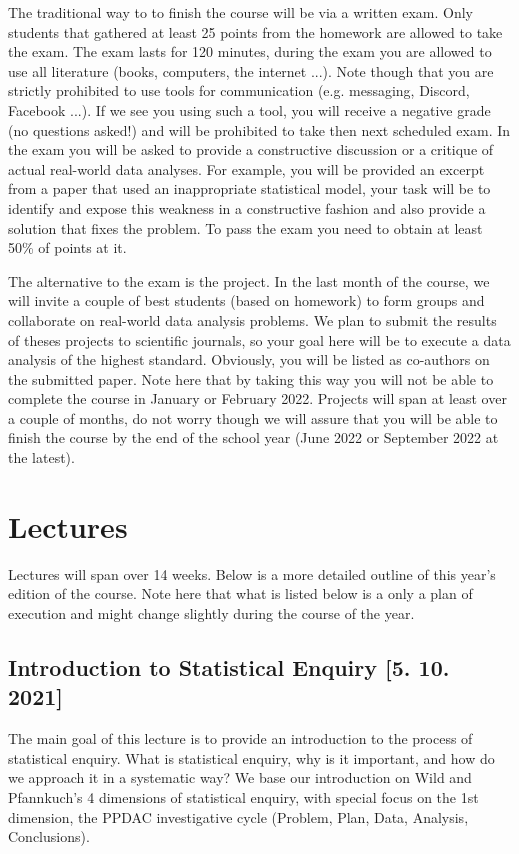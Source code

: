 \documentclass[fleqn,moreauthors,10pt]{ds_report}
\begin{document}
The traditional way to to finish the course will be via a written exam. Only students that gathered at least 25 points from the homework are allowed to take the exam. The exam lasts for 120 minutes, during the exam you are allowed to use all literature (books, computers, the internet ...). Note though that you are strictly prohibited to use tools for communication (e.g. messaging, Discord, Facebook ...). If we see you using such a tool, you will receive a negative grade (no questions asked!) and will be prohibited to take then next scheduled exam. In the exam you will be asked to provide a constructive discussion or a critique of actual real-world data analyses. For example, you will be provided an excerpt from a paper that used an inappropriate statistical model, your task will be to identify and expose this weakness in a constructive fashion and also provide a solution that fixes the problem. To pass the exam you need to obtain at least 50\% of points at it.

The alternative to the exam is the project. In the last month of the course, we will invite a couple of best students (based on homework) to form groups and collaborate on real-world data analysis problems. We plan to submit the results of theses projects to scientific journals, so your goal here will be to execute a data analysis of the highest standard. Obviously, you will be listed as co-authors on the submitted paper. Note here that by taking this way you will not be able to complete the course in January or February 2022. Projects will span at least over a couple of months, do not worry though we will assure that you will be able to finish the course by the end of the school year (June 2022 or September 2022 at the latest).

\section*{Lectures}

Lectures will span over 14 weeks. Below is a more detailed outline of this year's edition of the course. Note here that what is listed below is a only a plan of execution and might change slightly during the course of the year.

\subsection*{Introduction to Statistical Enquiry [5. 10. 2021]}

The main goal of this lecture is to provide an introduction to the process of statistical enquiry. What is statistical enquiry, why is it important, and how do we approach it in a systematic way? We base our introduction on Wild and Pfannkuch’s 4 dimensions of statistical enquiry, with special focus on the 1st dimension, the PPDAC investigative cycle (Problem, Plan, Data, Analysis, Conclusions).
\end{document}
